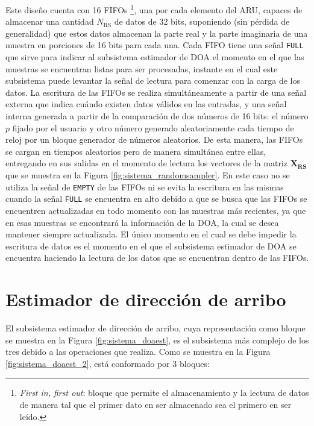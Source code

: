 Este diseño cuenta con 16 FIFOs \footnote{\emph{First in, first out}: bloque que permite el almacenamiento y la lectura de datos de manera tal que el primer dato en ser almacenado sea el primero en ser leído.}, una por cada elemento del ARU, capaces de almacenar una cantidad $N_{\textrm{RS}}$ de datos de 32 bits, suponiendo (sin pérdida de generalidad) que estos datos almacenan la parte real y la parte imaginaria de una muestra en porciones de 16 bits para cada una. Cada FIFO tiene una señal \texttt{FULL} que sirve para indicar al subsistema estimador de DOA el momento en el que las muestras se encuentran listas para ser procesadas, instante en el cual este subsistema puede levantar la señal de lectura para comenzar con la carga de los datos. La escritura de las FIFOs se realiza simultáneamente a partir de una señal externa que indica cuándo existen datos válidos en las entradas, y una señal interna generada a partir de la comparación de dos números de 16 bits: el número $p$ fijado por el usuario y otro número generado aleatoriamente cada tiempo de reloj por un bloque generador de números aleatorios. De esta manera, las FIFOs se cargan en tiempos aleatorios pero de manera simultánea entre ellas, entregando en sus salidas en el momento de lectura los vectores de la matriz $\mathbf{X_{RS}}$ que se muestra en la Figura \ref{fig:sistema_randomsampler}. En este caso no se utiliza la señal de \texttt{EMPTY} de las FIFOs ni se evita la escritura en las mismas cuando la señal \texttt{FULL} se encuentra en alto debido a que se busca que las FIFOs se encuentren actualizadas en todo momento con las muestras más recientes, ya que en esas muestras se encontrará la información de la DOA, la cual se desea mantener siempre actualizada. El único momento en el cual se debe impedir la escritura de datos es el momento en el que el subsistema estimador de DOA se encuentra haciendo la lectura de los datos que se encuentran dentro de las FIFOs.

\section{Estimador de dirección de arribo}\label{subc:sistema_doa_estimator}

El subsistema estimador de dirección de arribo, cuya representación como bloque se muestra en la Figura \ref{fig:sistema_doaest}, es el subsistema más complejo de los tres debido a las operaciones que realiza. Como se muestra en la Figura \ref{fig:sistema_doaest_2}, está conformado por 3 bloques:

